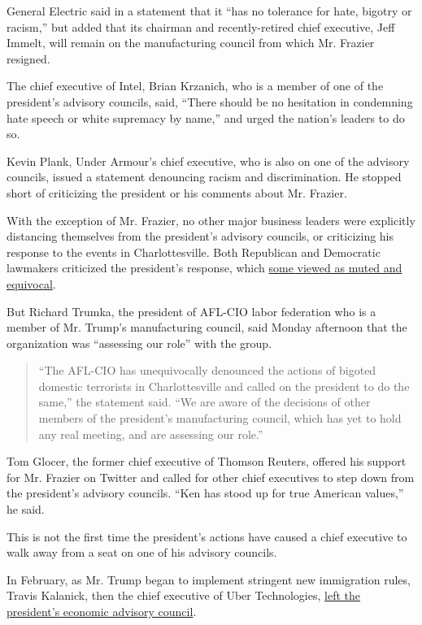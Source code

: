 General Electric said in a statement that it ``has no tolerance for
hate, bigotry or racism,'' but added that its chairman and
recently-retired chief executive, Jeff Immelt, will remain on the
manufacturing council from which Mr. Frazier resigned.

The chief executive of Intel, Brian Krzanich, who is a member of one of
the president's advisory councils, said, ``There should be no hesitation
in condemning hate speech or white supremacy by name,'' and urged the
nation's leaders to do so.

Kevin Plank, Under Armour's chief executive, who is also on one of the
advisory councils, issued a statement denouncing racism and
discrimination. He stopped short of criticizing the president or his
comments about Mr. Frazier.

With the exception of Mr. Frazier, no other major business leaders were
explicitly distancing themselves from the president's advisory councils,
or criticizing his response to the events in Charlottesville. Both
Republican and Democratic lawmakers criticized the president's response,
which
\href{https://www.nytimes3xbfgragh.onion/2017/08/12/us/trump-charlottesville-protest-nationalist-riot.html}{some
viewed as muted and equivocal}.

But Richard Trumka, the president of AFL-CIO labor federation who is a
member of Mr. Trump's manufacturing council, said Monday afternoon that
the organization was ``assessing our role'' with the group.

\begin{quote}
``The AFL-CIO has unequivocally denounced the actions of bigoted
domestic terrorists in Charlottesville and called on the president to do
the same,'' the statement said. ``We are aware of the decisions of other
members of the president's manufacturing council, which has yet to hold
any real meeting, and are assessing our role.''
\end{quote}

Tom Glocer, the former chief executive of Thomson Reuters, offered his
support for Mr. Frazier on Twitter and called for other chief executives
to step down from the president's advisory councils. ``Ken has stood up
for true American values,'' he said.

This is not the first time the president's actions have caused a chief
executive to walk away from a seat on one of his advisory councils.

In February, as Mr. Trump began to implement stringent new immigration
rules, Travis Kalanick, then the chief executive of Uber Technologies,
\href{https://www.nytimes3xbfgragh.onion/2017/02/02/technology/uber-ceo-travis-kalanick-trump-advisory-council.html?_r=0}{left
the president's economic advisory council}.

